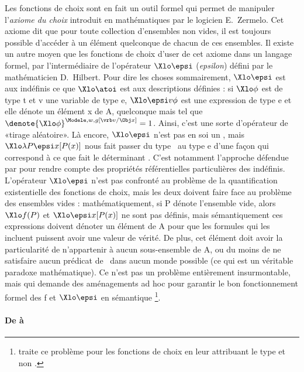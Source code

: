 
Les fonctions de choix sont en fait un outil formel qui permet de manipuler l'\emph{axiome du choix} introduit en mathématiques par le logicien E.\ Zermelo.  Cet axiome dit que pour toute collection d'ensembles non vides, il est  toujours possible d'accéder à un élément quelconque de chacun de ces ensembles.   
Il existe un autre moyen que les fonctions de choix d'user de cet axiome dans un langage formel, par l'intermédiaire de l'opérateur $\Xlo\epsi$ (\emph{epsilon}) défini par le mathématicien D.\ Hilbert.  Pour dire les choses sommairement, $\Xlo\epsi$ est aux indéfinis ce que $\Xlo\atoi$ est aux descriptions définies : si $\Xlo\phi$ est de type \typ t et \vrb v une variable de type \typ e, $\Xlo\epsi v\phi$ est une expression de type \typ e et elle dénote un élément \Obj x de \Unv A, quelconque mais tel que \(\denote{\Xlo\phi}^{\Modele,w,g[\vrb v/\Obj x]}=1\).  Ainsi, c'est une sorte d'opérateur de «tirage aléatoire».
Là encore, $\Xlo\epsi$ n'est pas en soi un , mais $\Xlo\lambda P\epsi x[P(x)]$ nous fait passer du type \et\ au type \typ e d'une façon qui correspond à ce que fait le déterminant .  C'est notamment l'approche défendue par \citet{Heusinger:00} pour rendre compte des propriétés référentielles particulières des indéfinis.
L'opérateur $\Xlo\epsi$ n'est pas confronté au problème de la quantification existentielle des fonctions de choix, mais les deux doivent faire face au problème des ensembles vides : mathématiquement, si \vrb P dénote l'ensemble vide, alors $\Xlo f(P)$ et $\Xlo\epsi x[P(x)]$ ne sont pas définis, mais sémantiquement ces expressions doivent dénoter un élément de \Unv A pour que les formules qui les incluent puissent avoir une valeur de vérité.  De plus, cet élément doit avoir la particularité de n'appartenir à aucun sous-ensemble de \Unv A, ou du moins de ne satisfaire aucun prédicat de \LO\ dans aucun monde possible (ce qui est un véritable paradoxe mathématique). Ce n'est pas un problème entièrement insurmontable, mais qui demande des aménagements {ad hoc} pour garantir le bon fonctionnement formel des \vrb f et $\Xlo\epsi$ en sémantique%
\footnote{\citet{Winter:97} traite ce problème pour les fonctions de choix en leur attribuant le type \type{\et,\ett} et non .}.


\paragraph*{De  à }

